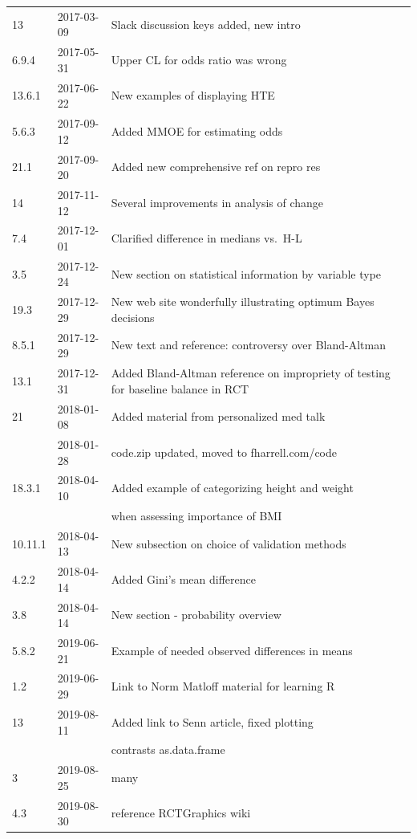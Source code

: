 \documentclass{report}
\begin{document}
\begin{center}
\begin{tabular}{lll}
13      & 2017-03-09 & Slack discussion keys added, new intro \\
6.9.4   & 2017-05-31 & Upper CL for odds ratio was wrong \\
13.6.1  & 2017-06-22 & New examples of displaying HTE \\
5.6.3   & 2017-09-12 & Added MMOE for estimating odds \\
21.1    & 2017-09-20 & Added new comprehensive ref on repro res \\
14      & 2017-11-12 & Several improvements in analysis of change\\
7.4     & 2017-12-01 & Clarified difference in medians vs.\ H-L\\
3.5     & 2017-12-24 & New section on statistical information by
                       variable type\\
19.3    & 2017-12-29 & New web site wonderfully illustrating optimum
                       Bayes decisions\\
8.5.1   & 2017-12-29 & New text and reference: controversy over
                       Bland-Altman\\
13.1    & 2017-12-31 & Added Bland-Altman reference on impropriety of
                       testing for baseline balance in RCT\\
21      & 2018-01-08 & Added material from personalized med talk\\
        & 2018-01-28 & code.zip updated, moved to fharrell.com/code\\
18.3.1  & 2018-04-10 & Added example of categorizing height and weight\\
        &            & when assessing importance of BMI\\
10.11.1 & 2018-04-13 & New subsection on choice of validation methods\\
4.2.2   & 2018-04-14 & Added Gini's mean difference\\
3.8     & 2018-04-14 & New section - probability overview\\
5.8.2   & 2019-06-21 & Example of needed observed differences in means\\
1.2     & 2019-06-29 & Link to Norm Matloff material for learning R\\
13      & 2019-08-11 & Added link to Senn article, fixed plotting\\
        &            & contrasts as.data.frame\\
3       & 2019-08-25 & many\\
4.3     & 2019-08-30 & reference RCTGraphics wiki\\

\end{tabular}
\end{center}
\end{document}
